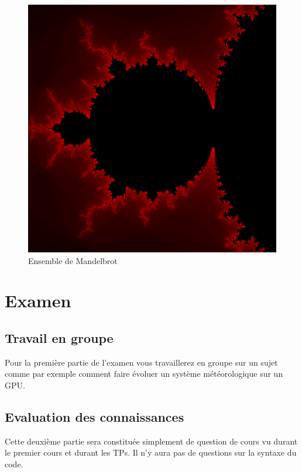 \documentclass[french,12pt]{article}
\begin{document}
\begin{figure}[H]
	\centering
	\includegraphics[scale=0.1]{figures/Mandelbrot.png}
	\caption{Ensemble de Mandelbrot}
\end{figure}

\section{Examen}
\subsection{Travail en groupe}
Pour la première partie de l'examen vous travaillerez en groupe sur un sujet comme par exemple comment faire évoluer un système météorologique sur un GPU.
\subsection{Evaluation des connaissances}
Cette deuxième partie sera constituée simplement de question de cours vu durant le premier cours et durant les TPs. Il n'y aura pas de questions sur la syntaxe du code.
\end{document}
